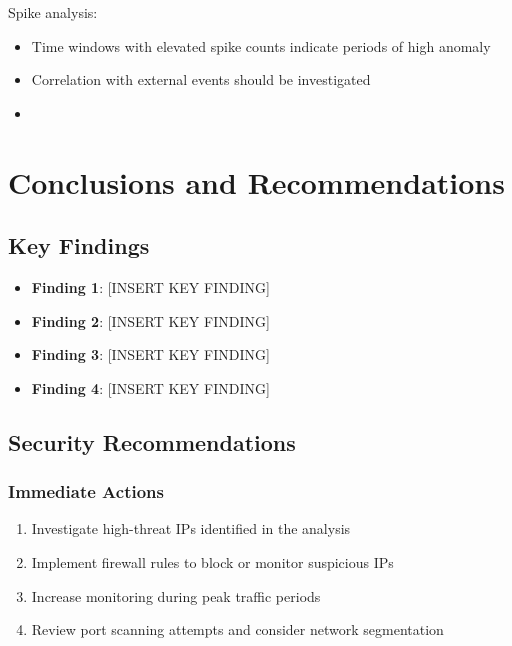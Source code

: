 \documentclass[12pt,a4paper]{report}
\begin{document}
Spike analysis:
\begin{itemize}
    \item Time windows with elevated spike counts indicate periods of high anomaly
    \item Correlation with external events should be investigated
    \item [INSERT SPIKE PATTERN OBSERVATIONS]
\end{itemize}

\chapter{Conclusions and Recommendations}

\section{Key Findings}

\begin{itemize}
    \item \textbf{Finding 1}: [INSERT KEY FINDING]
    \item \textbf{Finding 2}: [INSERT KEY FINDING]
    \item \textbf{Finding 3}: [INSERT KEY FINDING]
    \item \textbf{Finding 4}: [INSERT KEY FINDING]
\end{itemize}

\section{Security Recommendations}

\subsection{Immediate Actions}

\begin{enumerate}
    \item Investigate high-threat IPs identified in the analysis
    \item Implement firewall rules to block or monitor suspicious IPs
    \item Increase monitoring during peak traffic periods
    \item Review port scanning attempts and consider network segmentation
\end{enumerate}
\end{document}
